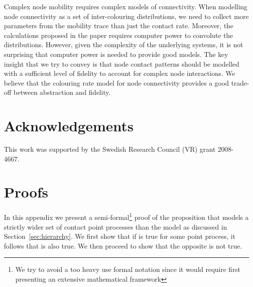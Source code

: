 \documentclass{article}
\begin{document}
Complex node mobility requires complex models of connectivity. When
modelling node connectivity as a set of inter-colouring distributions,
we need to collect more parameters from the mobility trace than just
the contact rate. Moreover, the calculations proposed in the paper
requires computer power to convolute the distributions. However, given
the complexity of the underlying systems, it is not surprising that
computer power is needed to provide good models. The key insight that
we try to convey is that node contact patterns should be modelled with
a sufficient level of fidelity to account for complex node
interactions. We believe that the colouring rate model for node
connectivity provides a good trade-off between abstraction and
fidelity.



\section{Acknowledgements}
This work was supported by the Swedish Research Council (VR) grant
2008-4667. 


\appendix


\section{Proofs}


In this appendix we present a semi-formal\footnote{We try to avoid a
  too heavy use formal notation since it would require first
  presenting an extensive mathematical framework} proof of the
proposition that  models a strictly wider set of contact point
processes than the  model as
discussed in Section~\ref{sec:hierarchy}. We first show that if
 is true for some point process, it
follows that  is also true. We then proceed to show that the
opposite is not true.
\end{document}
